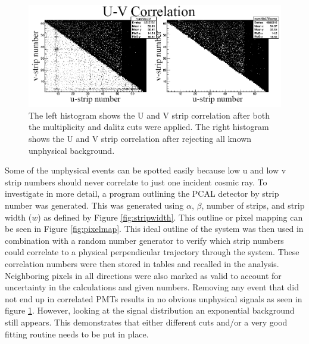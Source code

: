\begin{figure}[h]
\centering
\includegraphics[width= 6in, keepaspectratio = true]{occupationnum}
\caption{The left histogram shows the U and V strip correlation after both the multiplicity and dalitz cuts were applied. The right 
histogram shows the U and V strip correlation after rejecting all known unphysical background.}
\label{fig:occupationnum}
\end{figure}


Some of the unphysical events can be spotted easily because low u and low v strip numbers should never correlate to just one incident cosmic ray.
To investigate in more detail, a program outlining the PCAL detector by strip number was generated.
This was generated using $\alpha$, $\beta$, number of strips, and strip width ($w$) as defined by Figure \ref{fig:stripwidth}. This outline or pixel mapping can be seen in Figure \ref{fig:pixelmap}.
This ideal outline of the system was then used in combination with a random number generator to verify which strip numbers could correlate to a physical perpendicular trajectory through the system.
These correlation numbers were then stored in tables and recalled in the analysis. Neighboring pixels in all directions were also marked as valid to account for uncertainty in the calculations and given numbers. 
Removing any event that did not end up in correlated PMTs results in no obvious unphysical signals as seen in figure \ref{fig:occupationnum}. 
However, looking at the signal distribution an exponential background still appears. This demonstrates that either different cuts and/or a very good fitting routine needs to be put in place.



\FloatBarrier
